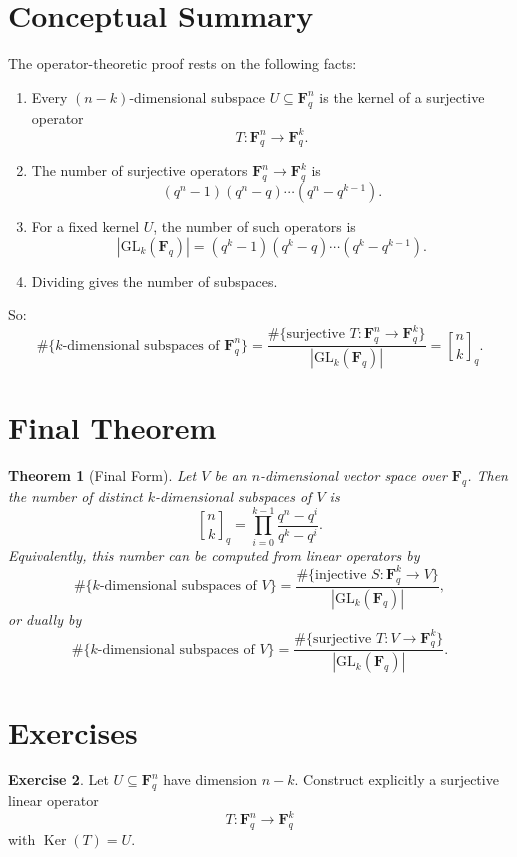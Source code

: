 \documentclass[11pt]{article}
\newtheorem{theorem}{Theorem}[section]
\theoremstyle{definition}
\newtheorem{exercise}[theorem]{Exercise}
\theoremstyle{remark}
\newcommand{\F}{\mathbf{F}}
\newcommand{\GL}{\mathrm{GL}}
\newcommand{\Ker}{\operatorname{Ker}}
\newcommand{\qbinom}[2]{\genfrac{[}{]}{0pt}{}{#1}{#2}_q}
\begin{document}
	\section{Conceptual Summary}
	
	The operator-theoretic proof rests on the following facts:
	
	\begin{enumerate}[label=\arabic*.]
		\item Every \((n-k)\)-dimensional subspace \(U\subseteq \F_q^n\) is the kernel of a surjective operator
		\[
		T:\F_q^n\to \F_q^k.
		\]
		\item The number of surjective operators \(\F_q^n\to \F_q^k\) is
		\[
		(q^n-1)(q^n-q)\cdots(q^n-q^{k-1}).
		\]
		\item For a fixed kernel \(U\), the number of such operators is
		\[
		|\GL_k(\F_q)|
		=
		(q^k-1)(q^k-q)\cdots(q^k-q^{k-1}).
		\]
		\item Dividing gives the number of subspaces.
	\end{enumerate}
	
	So:
	\[
	\boxed{
		\#\{\text{\(k\)-dimensional subspaces of }\F_q^n\}
		=
		\frac{\#\{\text{surjective }T:\F_q^n\to \F_q^k\}}
		{|\GL_k(\F_q)|}
		=
		\qbinom{n}{k}
	}.
	\]
	
	\section{Final Theorem}
	
	\begin{theorem}[Final Form]
		Let \(V\) be an \(n\)-dimensional vector space over \(\F_q\). Then the number of distinct \(k\)-dimensional subspaces of \(V\) is
		\[
		\boxed{
			\qbinom{n}{k}
			=
			\prod_{i=0}^{k-1}\frac{q^n-q^i}{q^k-q^i}
		}.
		\]
		Equivalently, this number can be computed from linear operators by
		\[
		\#\{\text{\(k\)-dimensional subspaces of }V\}
		=
		\frac{\#\{\text{injective }S:\F_q^k\to V\}}{|\GL_k(\F_q)|},
		\]
		or dually by
		\[
		\#\{\text{\(k\)-dimensional subspaces of }V\}
		=
		\frac{\#\{\text{surjective }T:V\to \F_q^k\}}{|\GL_k(\F_q)|}.
		\]
	\end{theorem}
	
	\section{Exercises}
	
	\begin{exercise}
		Let \(U\subseteq \F_q^n\) have dimension \(n-k\). Construct explicitly a surjective linear operator
		\[
		T:\F_q^n\to \F_q^k
		\]
		with \(\Ker(T)=U\).
	\end{exercise}
	
\end{document}
